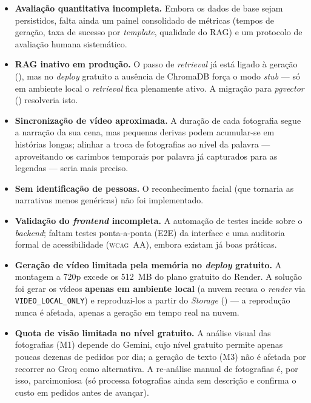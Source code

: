 \begin{itemize}[leftmargin=*]
  \item \textbf{Avaliação quantitativa incompleta.} Embora os dados de
  base sejam persistidos, falta ainda um painel consolidado de métricas
  (tempos de geração, taxa de sucesso por \emph{template}, qualidade do
  RAG) e um protocolo de avaliação humana sistemático.
  \item \textbf{RAG inativo em produção.} O passo de \emph{retrieval} já
  está ligado à geração (), mas no \emph{deploy}
  gratuito a ausência de ChromaDB força o modo \emph{stub} — só em ambiente
  local o \emph{retrieval} fica plenamente ativo. A migração para
  \emph{pgvector} () resolveria isto.
  \item \textbf{Sincronização de vídeo aproximada.} A duração de cada
  fotografia segue a narração da sua cena, mas pequenas derivas podem
  acumular-se em histórias longas; alinhar a troca de fotografias ao nível
  da palavra --- aproveitando os carimbos temporais por palavra já
  capturados para as legendas --- seria mais preciso.
  \item \textbf{Sem identificação de pessoas.} O reconhecimento facial
  (que tornaria as narrativas menos genéricas) não foi implementado.
  \item \textbf{Validação do \emph{frontend} incompleta.} A automação de
  testes incide sobre o \emph{backend}; faltam testes ponta-a-ponta (E2E) da
  interface e uma auditoria formal de acessibilidade (\textsc{wcag}~AA),
  embora existam já boas práticas.
  \item \textbf{Geração de vídeo limitada pela memória no \emph{deploy}
  gratuito.} A montagem a 720p excede os 512~MB do plano gratuito do Render.
  A solução foi gerar os vídeos \textbf{apenas em ambiente local} (a nuvem
  recusa o \emph{render} via \texttt{VIDEO\_LOCAL\_ONLY}) e reproduzi-los a
  partir do \emph{Storage} () --- a reprodução nunca é
  afetada, apenas a geração em tempo real na nuvem.
  \item \textbf{Quota de visão limitada no nível gratuito.} A análise visual
  das fotografias (M1) depende do Gemini, cujo nível gratuito permite apenas
  poucas dezenas de pedidos por dia; a geração de texto (M3) não é afetada por
  recorrer ao Groq como alternativa. A re-análise manual de fotografias é, por
  isso, parcimoniosa (só processa fotografias ainda sem descrição e confirma o
  custo em pedidos antes de avançar).
\end{itemize}

